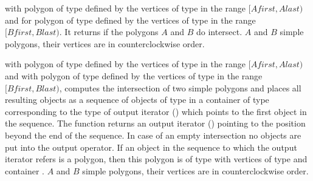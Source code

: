 

{with polygon  of type  defined by the
 vertices of type 
  in the range 
 $[Afirst,Alast)$
 and for polygon  of type  defined by the
 vertices of type  in the range $[Bfirst,Blast)$. 
 It returns  if the polygons $A$ and $B$ do intersect.
\ccPrecond $A$ and $B$ simple polygons, their vertices are in
counterclockwise order.}



{with polygon  of type  defined by the 
 vertices of type  in the range 
 $[Afirst,Alast)$
 and with polygon  of type  defined by the
 vertices of type  in the range $[Bfirst,Blast)$,
 computes the intersection of two simple polygons and places all
resulting objects as a sequence of objects of type 
in a container of type corresponding to the type of 
output iterator ()
 which points to the first object in the
sequence. 
The function returns an output iterator () 
pointing to the position beyond the end of the sequence.
In case of an 
empty intersection no objects are put into the output operator.
 If an object in the sequence to which the output iterator refers is a
 polygon, then this polygon is of type  with 
 vertices of type  and container 
 .
 \ccPrecond $A$ and $B$ simple polygons, their vertices are in
counterclockwise order.
}



